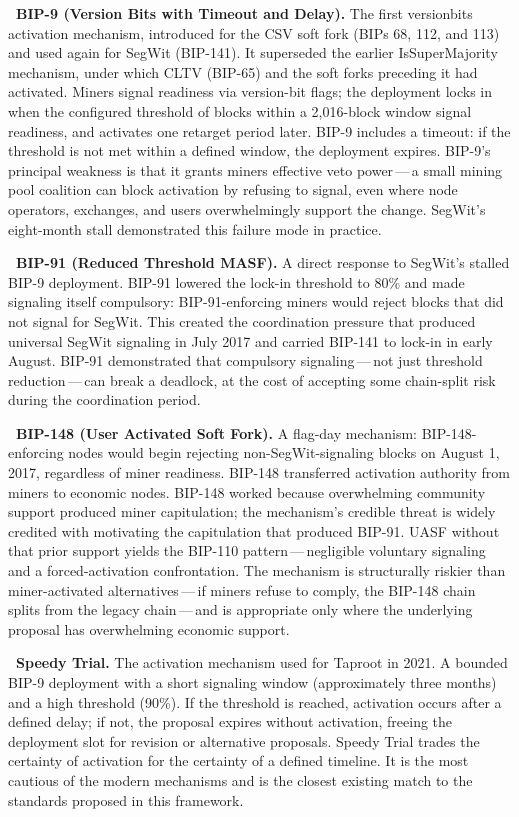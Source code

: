 \documentclass[11pt, twoside, openright]{book}
\newcommand{\reqitem}[2]{\medskip\noindent\textbf{#1\ #2}\quad\ignorespaces}
\begin{document}
\reqitem{}{BIP-9 (Version Bits with Timeout and Delay).} The first versionbits activation mechanism, introduced for the CSV soft fork (BIPs 68, 112, and 113) and used again for SegWit (BIP-141). It superseded the earlier IsSuperMajority mechanism, under which CLTV (BIP-65) and the soft forks preceding it had activated. Miners signal readiness via version-bit flags; the deployment locks in when the configured threshold of blocks within a 2{,}016-block window signal readiness, and activates one retarget period later. BIP-9 includes a timeout: if the threshold is not met within a defined window, the deployment expires. BIP-9's principal weakness is that it grants miners effective veto power\,---\,a small mining pool coalition can block activation by refusing to signal, even where node operators, exchanges, and users overwhelmingly support the change. SegWit's eight-month stall demonstrated this failure mode in practice.

\reqitem{}{BIP-91 (Reduced Threshold MASF).} A direct response to SegWit's stalled BIP-9 deployment. BIP-91 lowered the lock-in threshold to 80\% and made signaling itself compulsory: BIP-91-enforcing miners would reject blocks that did not signal for SegWit. This created the coordination pressure that produced universal SegWit signaling in July 2017 and carried BIP-141 to lock-in in early August. BIP-91 demonstrated that compulsory signaling\,---\,not just threshold reduction\,---\,can break a deadlock, at the cost of accepting some chain-split risk during the coordination period.

\reqitem{}{BIP-148 (User Activated Soft Fork).} A flag-day mechanism: BIP-148-enforcing nodes would begin rejecting non-SegWit-signaling blocks on August 1, 2017, regardless of miner readiness. BIP-148 transferred activation authority from miners to economic nodes. BIP-148 worked because overwhelming community support produced miner capitulation; the mechanism's credible threat is widely credited with motivating the capitulation that produced BIP-91. UASF without that prior support yields the BIP-110 pattern\,---\,negligible voluntary signaling and a forced-activation confrontation. The mechanism is structurally riskier than miner-activated alternatives\,---\,if miners refuse to comply, the BIP-148 chain splits from the legacy chain\,---\,and is appropriate only where the underlying proposal has overwhelming economic support.

\reqitem{}{Speedy Trial.} The activation mechanism used for Taproot in 2021. A bounded BIP-9 deployment with a short signaling window (approximately three months) and a high threshold (90\%). If the threshold is reached, activation occurs after a defined delay; if not, the proposal expires without activation, freeing the deployment slot for revision or alternative proposals. Speedy Trial trades the certainty of activation for the certainty of a defined timeline. It is the most cautious of the modern mechanisms and is the closest existing match to the standards proposed in this framework.
\end{document}
